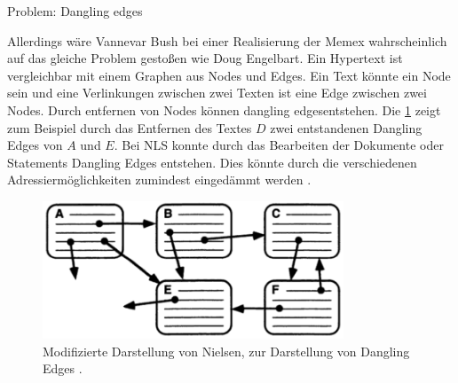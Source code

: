 \begin{section}{Problem: Dangling edges}
\label{sec:dangling}

Allerdings wäre Vannevar Bush bei einer Realisierung der Memex wahrscheinlich auf das gleiche Problem gestoßen wie Doug Engelbart. Ein Hypertext ist vergleichbar mit einem Graphen aus Nodes und Edges. Ein Text könnte ein Node sein und eine Verlinkungen zwischen zwei Texten ist eine Edge zwischen zwei Nodes. Durch entfernen von Nodes können \glqq dangling edges\grqq{ }entstehen. Die \ref{fig:dangle} zeigt zum Beispiel durch das Entfernen des Textes $D$ zwei entstandenen Dangling Edges von $A$ und $E$. Bei NLS konnte durch das Bearbeiten der Dokumente oder Statements Dangling Edges entstehen. Dies könnte durch die verschiedenen Adressiermöglichkeiten zumindest eingedämmt werden \cite{Engelbart1984}.

\begin{figure}[!ht]
	\centering
	\includegraphics[width=0.8\textwidth]{image/dangle}
	\caption{Modifizierte Darstellung von Nielsen, zur Darstellung von Dangling Edges \cite[S.1]{Nielsen1995}.}
	\label{fig:dangle}
\end{figure}

\end{section}





